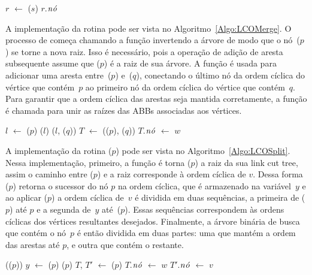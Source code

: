 \begin{algorithm}[htb]
\caption{\LCOFindNode($s$)}
\label{Algo:LCOFindNode}
\begin{algorithmic}[1]
\State $r$ $\gets$ \treapGetRoot($s$)
\State \Return $r$.$\mathit{n\acute{o}}$
\end{algorithmic}
\end{algorithm}


A implementação da rotina \LCOMerge{} pode ser vista no Algoritmo~\ref{Algo:LCOMerge}.
O processo de \LCOMerge{} começa chamando a função \linkcutEvert{} invertendo a árvore de modo que o nó~\treapLast($p$) se torne a nova raiz.
Isso é necessário, pois a operação \linkcutAddEdge{} de adição de aresta subsequente assume que \treapLast($p$) é a raiz de sua árvore.
A função \linkcutAddEdge{} é usada para adicionar uma aresta entre~\treapLast($p$) e~\treapFirst($q$), conectando o último nó da ordem cíclica do vértice que contém~$p$ ao primeiro nó da ordem cíclica do vértice que contém~$q$.
Para garantir que a ordem cíclica das arestas seja mantida corretamente, a função \treapJoin{} é chamada para unir as raízes das ABBs associadas aos vértices.

\begin{algorithm}[htb]
\caption{\LCOMerge($p$, $q$)}
\label{Algo:LCOMerge}
\begin{algorithmic}[1]
\State $l$ $\gets$ \treapLast($p$)
\State \linkcutEvert($l$)
\State \linkcutAddEdge($l$, \treapFirst($q$))
\State $T$ $\gets$ \treapJoin(\treapGetRoot($p$), \treapGetRoot($q$))
\State $T$.$\mathit{n\acute{o}}$ $\gets$ $w$ 
\end{algorithmic}
\end{algorithm}

A implementação da rotina \LCOSplit($p$) pode ser vista no Algoritmo~\ref{Algo:LCOSplit}.
Nessa implementação, primeiro, a função \linkcutEvert{} é torna \treapLast($p$) a raiz da sua link cut tree, assim o caminho entre \treapFirst($p$) e a raiz corresponde à ordem cíclica de $v$.
Dessa forma \linkcutParent($p$) retorna o sucessor do nó $p$ na ordem cíclica, que é armazenado na variável~$y$ e ao aplicar \linkcutDelEdge($p$) a ordem cíclica de~$v$ é dividida em duas sequências, a primeira de \treapFirst($p$) até $p$ e a segunda de~$y$ até~\treapLast($p$).
Essas sequências correspondem às ordens cíclicas dos vértices resultantes desejados.
Finalmente, a árvore binária de busca que contém o nó~$p$ é então dividida em duas partes: uma que mantém a ordem das arestas até $p$, e outra que contém o restante.

\begin{algorithm}[htb]
\caption{\LCOSplit($p$)}
\label{Algo:LCOSplit}
\begin{algorithmic}[1]
\State \linkcutEvert(\treapLast($p$))
\State $y$ $\gets$ \linkcutParent($p$)
\State \linkcutDelEdge($p$)
\State $T$, $T'$ $\gets$ \treapSplitRight($p$)
\State $T$.$\mathit{n\acute{o}}$ $\gets$ $w$
\State $T'$.$\mathit{n\acute{o}}$ $\gets$ $v$
\end{algorithmic}
\end{algorithm}


